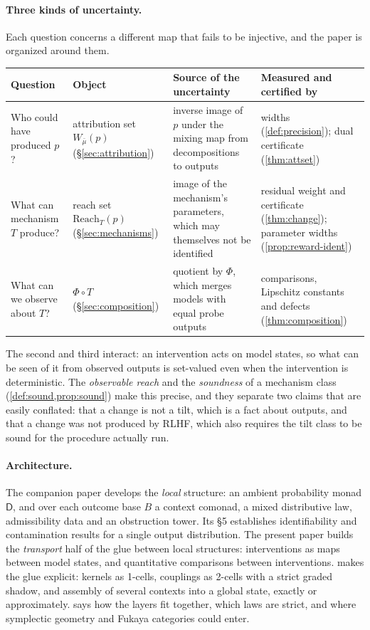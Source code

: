 \documentclass[11pt]{article}
\theoremstyle{definition}
\theoremstyle{remark}
\newcommand{\D}{\mathsf{D}}
\newcommand{\Reach}{\mathrm{Reach}}
\begin{document}
\paragraph{Three kinds of uncertainty.} Each question concerns a different map that fails to be
injective, and the paper is organized around them.

\begin{center}\small
\begin{tabular}{@{}p{}p{}p{}p{}@{}}
\toprule
Question & Object & Source of the uncertainty & Measured and certified by\\
\midrule
Who could have produced $p$? & attribution set $W_{\bar\mu}(p)$ (\S\ref{sec:attribution}) &
inverse image of $p$ under the mixing map from decompositions to outputs & widths
(\cref{def:precision}); dual certificate (\cref{thm:attset})\\
What can mechanism $T$ produce? & reach set $\Reach_T(p)$ (\S\ref{sec:mechanisms}) & image of the
mechanism's parameters, which may themselves not be identified & residual weight and certificate
(\cref{thm:change}); parameter widths (\cref{prop:reward-ident})\\
What can we observe about $T$? & $\Phi\circ T$ (\S\ref{sec:composition}) & quotient by $\Phi$, which
merges models with equal probe outputs & comparisons, Lipschitz constants and defects
(\cref{thm:composition})\\
\bottomrule
\end{tabular}
\end{center}

The second and third interact: an intervention acts on model states, so what can be seen of it from
observed outputs is set-valued even when the intervention is deterministic. The \emph{observable reach}
and the \emph{soundness} of a mechanism class (\cref{def:sound,prop:sound}) make this precise, and
they separate two claims that are easily conflated: that a change is not a tilt, which is a fact about
outputs, and that a change was not produced by RLHF, which also requires the tilt class to be sound
for the procedure actually run.

\paragraph{Architecture.} The companion paper \cite{Awasthi-Tower} develops the \emph{local} structure:
an ambient probability monad $\D$, and over each outcome base $B$ a context comonad, a mixed
distributive law, admissibility data and an obstruction tower. Its \S5 establishes identifiability and
contamination results for a single output distribution. The present paper builds the
\emph{transport} half of the glue between local structures: interventions as maps between model
states, and quantitative comparisons between interventions.  makes the glue
explicit: kernels as 1-cells, couplings as 2-cells with a strict graded shadow, and assembly of
several contexts into a global state, exactly or approximately.  says how the
layers fit together, which laws are strict, and where symplectic geometry and Fukaya categories could
enter.
\end{document}

